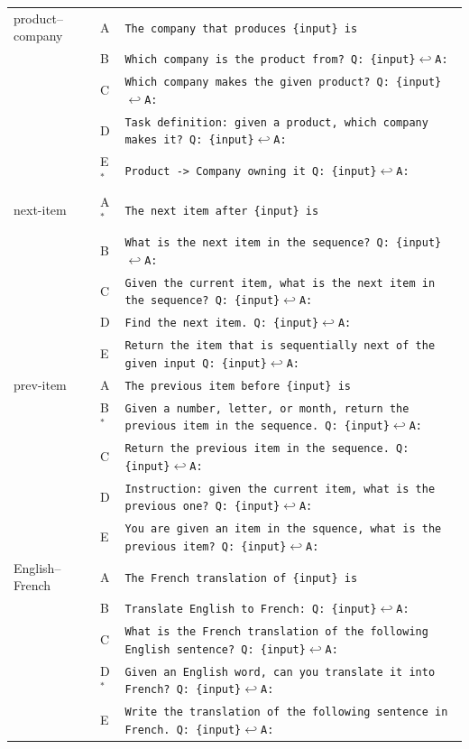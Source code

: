 {\begin{longtable}{@{}ll>{\raggedright\arraybackslash}p{}@{}}
product--company & A & \texttt{The company that produces \{input\} is} \\
 & B & \texttt{Which company is the product from? Q: \{input\}$\hookleftarrow$A:} \\
 & C & \texttt{Which company makes the given product? Q: \{input\}$\hookleftarrow$A:} \\
 & D & \texttt{Task definition: given a product, which company makes it? Q: \{input\}$\hookleftarrow$A:} \\
 & E$^\ast$ & \texttt{Product -> Company owning it Q: \{input\}$\hookleftarrow$A:} \\[3pt]
next-item & A$^\ast$ & \texttt{The next item after \{input\} is} \\
 & B & \texttt{What is the next item in the sequence? Q: \{input\}$\hookleftarrow$A:} \\
 & C & \texttt{Given the current item, what is the next item in the sequence? Q: \{input\}$\hookleftarrow$A:} \\
 & D & \texttt{Find the next item. Q: \{input\}$\hookleftarrow$A:} \\
 & E & \texttt{Return the item that is sequentially next of the given input Q: \{input\}$\hookleftarrow$A:} \\[3pt]
prev-item & A & \texttt{The previous item before \{input\} is} \\
 & B$^\ast$ & \texttt{Given a number, letter, or month, return the previous item in the sequence. Q: \{input\}$\hookleftarrow$A:} \\
 & C & \texttt{Return the previous item in the sequence. Q: \{input\}$\hookleftarrow$A:} \\
 & D & \texttt{Instruction: given the current item, what is the previous one? Q: \{input\}$\hookleftarrow$A:} \\
 & E & \texttt{You are given an item in the squence, what is the previous item? Q: \{input\}$\hookleftarrow$A:} \\[3pt]
English--French & A & \texttt{The French translation of \{input\} is} \\
 & B & \texttt{Translate English to French: Q: \{input\}$\hookleftarrow$A:} \\
 & C & \texttt{What is the French translation of the following English sentence? Q: \{input\}$\hookleftarrow$A:} \\
 & D$^\ast$ & \texttt{Given an English word, can you translate it into French? Q: \{input\}$\hookleftarrow$A:} \\
 & E & \texttt{Write the translation of the following sentence in French. Q: \{input\}$\hookleftarrow$A:} \\[3pt]

\end{longtable}}

